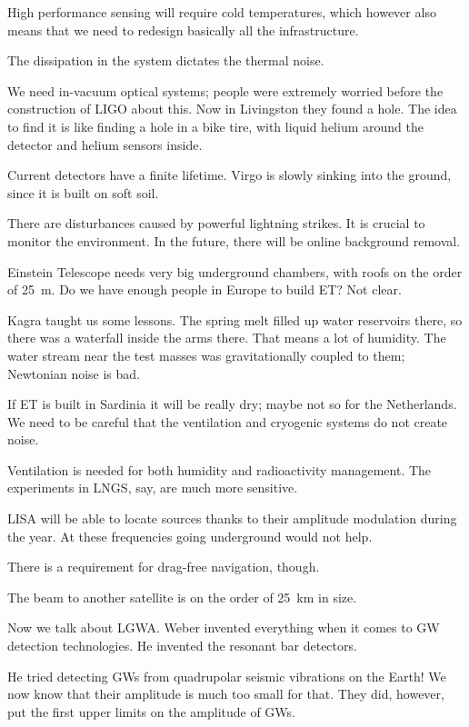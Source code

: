 \documentclass[main.tex]{subfiles}
\begin{document}
High performance sensing will require cold temperatures, which however 
also means that we need to redesign basically all the infrastructure. 

The dissipation in the system dictates the thermal noise. 

We need in-vacuum optical systems; people were extremely worried before the 
construction of LIGO about this. 
Now in Livingston they found a hole. 
The idea to find it is like finding a hole in a bike tire, with liquid helium
around the detector and helium sensors inside. 

Current detectors have a finite lifetime. Virgo is slowly sinking into the ground,
since it is built on soft soil. 

There are disturbances caused by powerful lightning strikes. 
It is crucial to monitor the environment. 
In the future, there will be online background removal. 

Einstein Telescope needs very big underground chambers,
with roofs on the order of \SI{25}{m}. 
Do we have enough people in Europe to build ET? Not clear.

Kagra taught us some lessons.
The spring melt filled up water reservoirs there, 
so there was a waterfall inside the arms there. 
That means a lot of humidity. 
The water stream near the test masses was gravitationally coupled to them; 
Newtonian noise is bad. 

If ET is built in Sardinia it will be really dry; maybe not so for the Netherlands. 
We need to be careful that the ventilation and cryogenic systems do not create noise. 

Ventilation is needed for both humidity and radioactivity management. 
The experiments in LNGS, say, are much more sensitive. 

LISA will be able to locate sources thanks to their amplitude modulation during the year. 
At these frequencies going underground would not help. 

There is a requirement for drag-free navigation, though. 

The beam to another satellite is on the order of \SI{25}{km} in size. 

Now we talk about LGWA. 
Weber invented everything when it comes to GW detection technologies. 
He invented the resonant bar detectors. 

He tried detecting GWs from quadrupolar seismic vibrations on the Earth! 
We now know that their amplitude is much too small for that. 
They did, however, put the first upper limits on the amplitude of GWs. 
\end{document}

